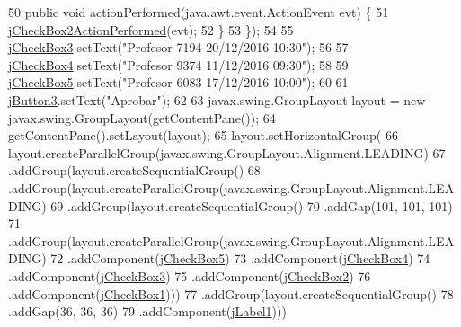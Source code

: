 \begin{DoxyCode}
50             \textcolor{keyword}{public} \textcolor{keywordtype}{void} actionPerformed(java.awt.event.ActionEvent evt) \{
51                 \mbox{\hyperlink{classinterfacessoguar_1_1cu14_ab06e0dd8b0c928c7b075a14a321a95d3}{jCheckBox2ActionPerformed}}(evt);
52             \}
53         \});
54 
55         \mbox{\hyperlink{classinterfacessoguar_1_1cu14_a4c2786ad18eecca82117bb2332a5cd4e}{jCheckBox3}}.setText(\textcolor{stringliteral}{"Profesor 7194 20/12/2016 10:30"});
56 
57         \mbox{\hyperlink{classinterfacessoguar_1_1cu14_ae6475562256fe6faa9f5f9cd776c64ab}{jCheckBox4}}.setText(\textcolor{stringliteral}{"Profesor 9374 11/12/2016 09:30"});
58 
59         \mbox{\hyperlink{classinterfacessoguar_1_1cu14_a76e9292b610a4832a729e128895d01cf}{jCheckBox5}}.setText(\textcolor{stringliteral}{"Profesor 6083 17/12/2016 10:00"});
60 
61         \mbox{\hyperlink{classinterfacessoguar_1_1cu14_a11bd8f94543f8cf53621a6e49d32df73}{jButton3}}.setText(\textcolor{stringliteral}{"Aprobar"});
62 
63         javax.swing.GroupLayout layout = \textcolor{keyword}{new} javax.swing.GroupLayout(getContentPane());
64         getContentPane().setLayout(layout);
65         layout.setHorizontalGroup(
66             layout.createParallelGroup(javax.swing.GroupLayout.Alignment.LEADING)
67             .addGroup(layout.createSequentialGroup()
68                 .addGroup(layout.createParallelGroup(javax.swing.GroupLayout.Alignment.LEADING)
69                     .addGroup(layout.createSequentialGroup()
70                         .addGap(101, 101, 101)
71                         .addGroup(layout.createParallelGroup(javax.swing.GroupLayout.Alignment.LEADING)
72                             .addComponent(\mbox{\hyperlink{classinterfacessoguar_1_1cu14_a76e9292b610a4832a729e128895d01cf}{jCheckBox5}})
73                             .addComponent(\mbox{\hyperlink{classinterfacessoguar_1_1cu14_ae6475562256fe6faa9f5f9cd776c64ab}{jCheckBox4}})
74                             .addComponent(\mbox{\hyperlink{classinterfacessoguar_1_1cu14_a4c2786ad18eecca82117bb2332a5cd4e}{jCheckBox3}})
75                             .addComponent(\mbox{\hyperlink{classinterfacessoguar_1_1cu14_a208f32a207595bd065c51596f0071a50}{jCheckBox2}})
76                             .addComponent(\mbox{\hyperlink{classinterfacessoguar_1_1cu14_a2719e7cf9ebc34ab6a28e47fe931c20c}{jCheckBox1}})))
77                     .addGroup(layout.createSequentialGroup()
78                         .addGap(36, 36, 36)
79                         .addComponent(\mbox{\hyperlink{classinterfacessoguar_1_1cu14_ae89f56f50be4fe2708a41087efcd4f01}{jLabel1}})))

\end{DoxyCode}
